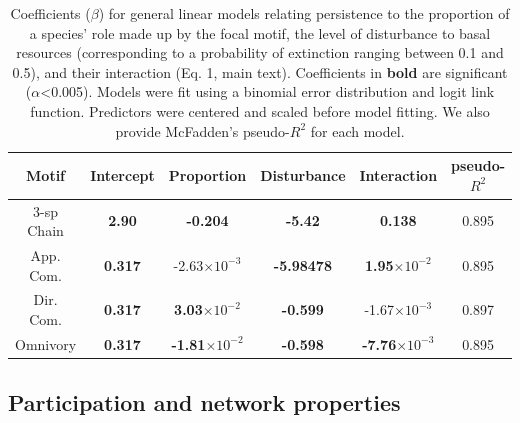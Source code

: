 \documentclass[12pt]{article}
\begin{document}
\begin{spacing}{2.0}
    \begin{table}[ht!]
        \centering
        \caption{Coefficients ($\beta$) for general linear models relating persistence to the proportion of a species' role made up by the focal motif, the level of disturbance to basal resources (corresponding to a probability of extinction ranging between 0.1 and 0.5), and their interaction  (Eq. 1, main text). Coefficients in \textbf{bold} are significant ($\alpha$\textless0.005). Models were fit using a binomial error distribution and logit link function. Predictors were centered and scaled before model fitting. We also provide McFadden's pseudo-$R^2$ for each model.}
        \label{tab:proportion}                \footnotesize
        \begin{tabular}{c|c c c c | c }
        Motif & Intercept & Proportion & Disturbance & Interaction & pseudo-$R^2$  \\
        \hline
        3-sp Chain & \textbf{2.90} & \textbf{-0.204} & \textbf{-5.42} & \textbf{0.138} & 0.895 \\
        App. Com. & \textbf{0.317} & -2.63$\times10^{-3}$ & \textbf{-5.98478} & \textbf{1.95$\times10^{-2}$} & 0.895 \\
        Dir. Com. & \textbf{0.317} & \textbf{3.03$\times10^{-2}$} & \textbf{-0.599} & -1.67$\times10^{-3}$ &  0.897 \\
        Omnivory & \textbf{0.317} & \textbf{-1.81$\times10^{-2}$} & \textbf{-0.598} & \textbf{-7.76$\times10^{-3}$} & 0.895 \\
        \end{tabular}
    \end{table}        

\subsection{Participation and network properties} 



\end{spacing}
\end{document}

